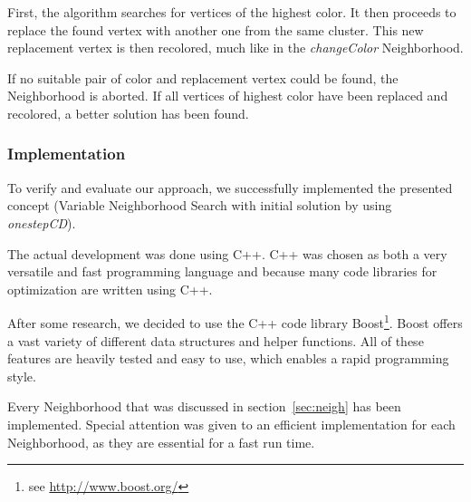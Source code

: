 \documentclass[paper=a4,fontsize=12pt]{scrartcl}
\begin{document}
First, the algorithm searches for vertices of the highest color. It then proceeds to replace the found vertex with another one from the same cluster. This new replacement vertex is then recolored, much like in the \emph{changeColor} Neighborhood. 

If no suitable pair of color and replacement vertex could be found, the Neighborhood is aborted. If all vertices of highest color have been replaced and recolored, a better solution has been found. 

\subsubsection{Implementation}
To verify and evaluate our approach, we successfully implemented the presented concept (Variable Neighborhood Search with initial solution by using \emph{onestepCD}). 

The actual development was done using C++. C++ was chosen as both a very versatile and fast programming language and because many code libraries for optimization are written using C++.



After some research, we decided to use the C++ code library Boost\footnote{see \url{http://www.boost.org/}}. Boost offers a vast variety of different data structures and helper functions. All of these features are heavily tested and easy to use, which enables a rapid programming style.


Every Neighborhood that was discussed in section~\ref{sec:neigh} has been implemented. Special attention was given to an efficient implementation for each Neighborhood, as they are essential for a fast run time.
\end{document}
